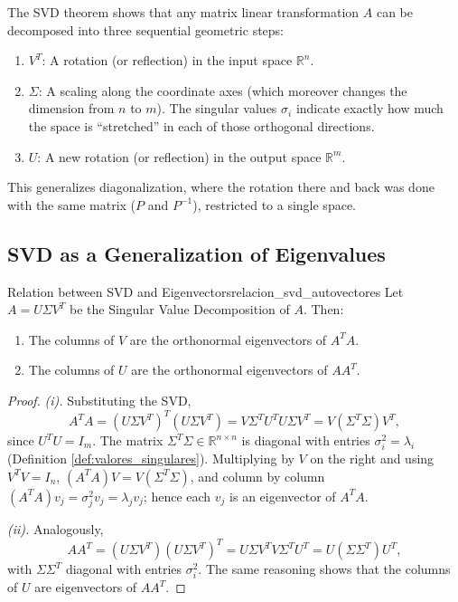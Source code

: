 \documentclass[11pt, a4paper]{article}
\begin{document}
The SVD theorem shows that any matrix linear transformation $A$ can be decomposed into three sequential geometric steps:
\begin{enumerate}
    \item $V^T$: A rotation (or reflection) in the input space $\mathbb{R}^n$.
    \item $\Sigma$: A scaling along the coordinate axes (which moreover changes the dimension from $n$ to $m$). The singular values $\sigma_i$ indicate exactly how much the space is ``stretched'' in each of those orthogonal directions.
    \item $U$: A new rotation (or reflection) in the output space $\mathbb{R}^m$.
\end{enumerate}
This generalizes diagonalization, where the rotation there and back was done with the same matrix ($P$ and $P^{-1}$), restricted to a single space.

\subsection{SVD as a Generalization of Eigenvalues}

\begin{proposicion}{Relation between SVD and Eigenvectors}{relacion_svd_autovectores}
Let $A = U \Sigma V^T$ be the Singular Value Decomposition of $A$. Then:
\begin{enumerate}
    \item[i)] The columns of $V$ are the orthonormal eigenvectors of $A^T A$.
    \item[ii)] The columns of $U$ are the orthonormal eigenvectors of $A A^T$.
\end{enumerate}
\end{proposicion}

\begin{proof}
\textit{(i).} Substituting the SVD,
\[ A^T A = (U \Sigma V^T)^T (U \Sigma V^T) = V \Sigma^T U^T U \Sigma V^T = V (\Sigma^T \Sigma) V^T, \]
since $U^T U = I_m$. The matrix $\Sigma^T \Sigma \in \mathbb{R}^{n \times n}$ is diagonal with entries $\sigma_i^2 = \lambda_i$ (Definition \ref{def:valores_singulares}). Multiplying by $V$ on the right and using $V^T V = I_n$, $(A^T A) V = V (\Sigma^T \Sigma)$, and column by column $(A^T A) v_j = \sigma_j^2 v_j = \lambda_j v_j$; hence each $v_j$ is an eigenvector of $A^T A$.

\textit{(ii).} Analogously,
\[ A A^T = (U \Sigma V^T)(U \Sigma V^T)^T = U \Sigma V^T V \Sigma^T U^T = U (\Sigma \Sigma^T) U^T, \]
with $\Sigma \Sigma^T$ diagonal with entries $\sigma_i^2$. The same reasoning shows that the columns of $U$ are eigenvectors of $A A^T$.
\end{proof}
\end{document}
